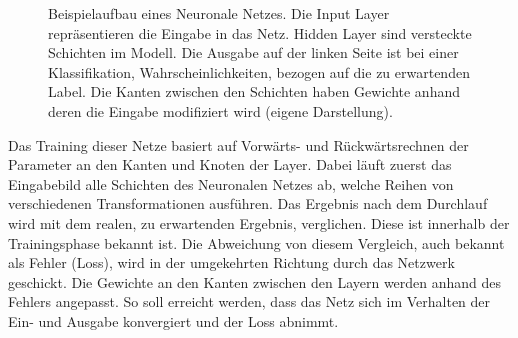 \def\layersep{2.5cm}
\begin{figure}[!tb]\centering
{}
\caption[Beispielaufbau eines Neuronale Netzes]{Beispielaufbau eines Neuronale Netzes. Die Input Layer repräsentieren die Eingabe in das Netz. Hidden Layer sind versteckte Schichten im Modell. Die Ausgabe auf der linken Seite ist bei einer Klassifikation, Wahrscheinlichkeiten, bezogen auf die  zu erwartenden Label. Die Kanten zwischen den Schichten haben Gewichte anhand deren die Eingabe modifiziert wird (eigene Darstellung).}\label{cap:neuralnet}
\end{figure}\label{fig:neuralnet}

Das Training dieser Netze basiert auf Vorwärts- und Rückwärtsrechnen der Parameter an den Kanten und Knoten der Layer. Dabei läuft zuerst das Eingabebild alle Schichten des Neuronalen Netzes ab, welche Reihen von verschiedenen Transformationen ausführen. Das Ergebnis nach dem Durchlauf wird mit dem realen, zu erwartenden Ergebnis, verglichen. Diese ist innerhalb der Trainingsphase bekannt ist. Die Abweichung von diesem Vergleich, auch bekannt als Fehler (Loss), wird in der umgekehrten Richtung durch das Netzwerk geschickt. Die Gewichte an den Kanten zwischen den Layern werden anhand des Fehlers angepasst. So soll erreicht werden, dass das Netz sich im Verhalten der Ein- und Ausgabe konvergiert und der Loss abnimmt.

